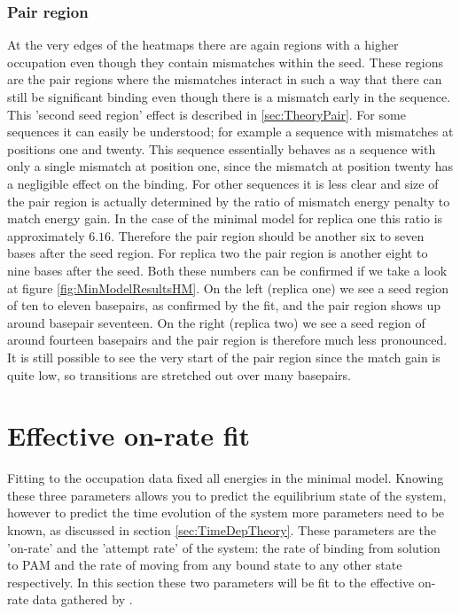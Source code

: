 \subsubsection{Pair region}
At the very edges of the heatmaps there are again regions with a higher occupation even though they contain mismatches within the seed. These regions are the pair regions where the mismatches interact in such a way that there can still be significant binding even though there is a mismatch early in the sequence. This 'second seed region' effect is described in \ref{sec:TheoryPair}. For some sequences it can easily be understood; for example a sequence with mismatches at positions one and twenty. This sequence essentially behaves as a sequence with only a single mismatch at position one, since the mismatch at position twenty has a negligible effect on the binding. For other sequences it is less clear and size of the pair region is actually determined by the ratio of mismatch energy penalty to match energy gain. In the case of the minimal model for replica one this ratio is approximately $6.16$. Therefore the pair region should be another six to seven bases after the seed region. For replica two the pair region is another eight to nine bases after the seed. Both these numbers can be confirmed if we take a look at figure \ref{fig:MinModelResultsHM}. On the left (replica one) we see a seed region of ten to eleven basepairs, as confirmed by the fit, and the pair region shows up around basepair seventeen. On the right (replica two) we see a seed region of around fourteen basepairs and the pair region is therefore much less pronounced. It is still possible to see the very start of the pair region since the match gain is quite low, so transitions are stretched out over many basepairs.


\section{Effective on-rate fit}

Fitting to the occupation data fixed all energies in the minimal model. Knowing these three parameters allows you to predict the equilibrium state of the system, however to predict the time evolution of the system more parameters need to be known, as discussed in section \ref{sec:TimeDepTheory}. These parameters are the 'on-rate' and the 'attempt rate' of the system: the rate of binding from solution to PAM and the rate of moving from any bound state to any other state respectively. In this section these two parameters will be fit to the effective on-rate data gathered by \cite{PNAS}.


